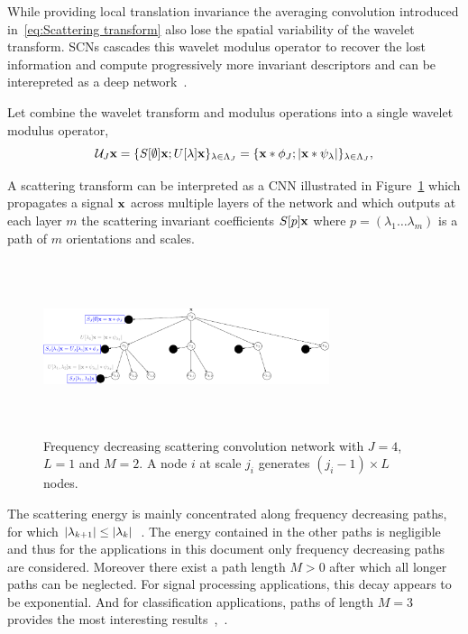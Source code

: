 \documentclass{article}
\begin{document}
    While providing local translation invariance the averaging convolution introduced in~\ref{eq:Scattering transform} also lose the spatial variability of the wavelet transform. SCNs cascades this wavelet modulus operator to recover the lost information and compute progressively more invariant descriptors and can be interepreted as a deep network~\cite{Deep Roto-Translation Scattering for Object Classification}.
    
    Let combine the wavelet transform and modulus operations into a single wavelet modulus operator,
    \begin{equation}
      \mathcal{U}_{J} {\bf x} = \{ S[\emptyset] {\bf x} ; U[\lambda]{\bf x} \}_{\lambda \in \Lambda_{J}} 
		      = \{ {\bf x} \ast \phi_{J}; \left| {\bf x} \ast \psi_{\lambda} \right| \}_{\lambda \in \Lambda_{J}},
      \label{eq:One step propagator}
    \end{equation}
    
     A scattering transform can be interpreted as a CNN illustrated in Figure~\ref{fig:SCN 1} which propagates a signal ${\bf x}$ across multiple layers of the network and which outputs at each layer $m$ the scattering invariant coefficients $S[p]{\bf x}$ where $p=(\lambda_{1} \dots \lambda_{m})$ is a path of $m$ orientations and scales.
  
    \begin{figure}[h]
      \begin{center}
	\includegraphics[width=3.3in, height=2in, keepaspectratio]{ST_freqDec_crop.pdf}
	\caption[Frequency decreasing scattering convolution network.]{\centering  Frequency decreasing scattering convolution network 	with $J=4$, $L=1$ and $M=2$. A node $i$ at scale $j_{i}$ generates $(j_{i}-1) \times L$ nodes. }
	\label{fig:SCN 1}
      \end{center}	
    \end{figure}
    
    The scattering energy is mainly concentrated along frequency decreasing paths, \ie for which $\left| \lambda_{k+1} \right| \leq \left| \lambda_{k} \right|$~\cite{mallat gis}. The energy contained in the other paths is negligible and thus for the applications in this document only frequency decreasing paths are considered. Moreover there exist a path length $M > 0$ after which all longer paths can be neglected. For signal processing applications, this decay appears to be exponential. And for classification applications, paths of length $M = 3$ provides the most interesting results~\citep{anden2011multiscale},~\citep{bruna2010classification}.\\
      
\end{document}
